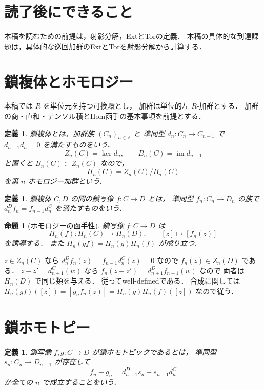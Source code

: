 \documentclass[a5paper,10pt,onecolumn]{jsarticle}
\makeatletter
\theoremstyle{mathnotetheorem}
\newtheorem{definition}[theorem]{定義}
\newtheorem{proposition}[theorem]{命題}
\renewcommand{\proofname}{証明}
\renewenvironment{proof}[1][\proofname]{%
  \par\pushQED{\qed}\normalfont\topsep4\p@\@plus2\p@\relax
  \trivlist\item[\hskip\labelsep\bfseries #1]\ignorespaces
}{\popQED\endtrivlist\@endpefalse}
\makeatother
\begin{document}
\section*{読了後にできること}
本稿を読むための前提は，射影分解，ExtとTorの定義．
本稿の具体的な到達課題は，具体的な巡回加群のExtとTorを射影分解から計算する．

\section{鎖複体とホモロジー}

本稿では $R$ を単位元を持つ可換環とし，
加群は単位的左 $R$-加群とする．
加群の商・直和・テンソル積とHom函手の基本事項を前提とする．

\begin{definition}
\emph{鎖複体}とは，加群族 $(C_n)_{n\in\mathbb Z}$ と
準同型 $d_n:C_n\to C_{n-1}$ で
$d_{n-1}d_n=0$ を満たすものをいう．
\[
 Z_n(C)=\ker d_n,\qquad
 B_n(C)=\operatorname{im}d_{n+1}
\]
と置くと $B_n(C)\subset Z_n(C)$ なので，
\[
 H_n(C)=Z_n(C)/B_n(C)
\]
を第 $n$ ホモロジー加群という．
\end{definition}

\begin{definition}
鎖複体 $C,D$ の間の鎖写像 $f:C\to D$ とは，
準同型 $f_n:C_n\to D_n$ の族で
$d^D_nf_n=f_{n-1}d^C_n$ を満たすものをいう．
\end{definition}

\begin{proposition}[ホモロジーの函手性]\label{prop:homology-functor}
鎖写像 $f:C\to D$ は
\[
 H_n(f):H_n(C)\to H_n(D),\qquad
 [z]\longmapsto[f_n(z)]
\]
を誘導する．
また $H_n(gf)=H_n(g)H_n(f)$ が成り立つ．
\end{proposition}
\begin{proof}
$z\in Z_n(C)$ なら
$d^D_nf_n(z)=f_{n-1}d^C_n(z)=0$ なので
$f_n(z)\in Z_n(D)$ である．
$z-z'=d^C_{n+1}(w)$ なら
$f_n(z-z')=d^D_{n+1}f_{n+1}(w)$ なので
両者は $H_n(D)$ で同じ類を与える．
従ってwell-definedである．
合成に関しては
$H_n(gf)([z])=[g_nf_n(z)]
=H_n(g)H_n(f)([z])$ なので従う．
\end{proof}

\section{鎖ホモトピー}

\begin{definition}
鎖写像 $f,g:C\to D$ が鎖ホモトピックであるとは，
準同型 $s_n:C_n\to D_{n+1}$ が存在して
\[
 f_n-g_n=d^D_{n+1}s_n+s_{n-1}d^C_n
\]
が全ての $n$ で成立することをいう．
\end{definition}
\end{document}
